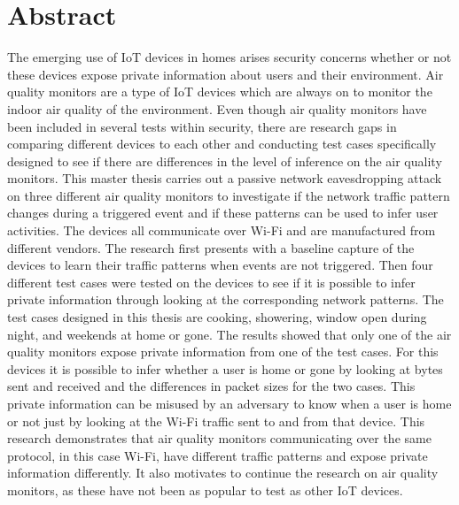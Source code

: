 \chapter*{Abstract}
The emerging use of \gls{IoT} devices in homes arises security concerns whether or not these devices expose private information about users and their environment. Air quality monitors are a type of \gls{IoT} devices which are always on to monitor the indoor air quality of the environment. Even though air quality monitors have been included in several tests within security, there are research gaps in comparing different devices to each other and conducting test cases specifically designed to see if there are differences in the level of inference on the air quality monitors. This master thesis carries out a passive network eavesdropping attack on three different air quality monitors to investigate if the network traffic pattern changes during a triggered event and if these patterns can be used to infer user activities. The devices all communicate over Wi-Fi and are manufactured from different vendors. The research first presents with a baseline capture of the devices to learn their traffic patterns when events are not triggered. Then four different test cases were tested on the devices to see if it is possible to infer private information through looking at the corresponding network patterns. The test cases designed in this thesis are cooking, showering, window open during night, and weekends at home or gone. The results showed that only one of the air quality monitors expose private information from one of the test cases. For this devices it is possible to infer whether a user is home or gone by looking at bytes sent and received and the differences in packet sizes for the two cases. This private information can be misused by an adversary to know when a user is home or not just by looking at the Wi-Fi traffic sent to and from that device. This research demonstrates that air quality monitors communicating over the same protocol, in this case Wi-Fi, have different traffic patterns and expose private information differently. It also motivates to continue the research on air quality monitors, as these have not been as popular to test as other \gls{IoT} devices. 